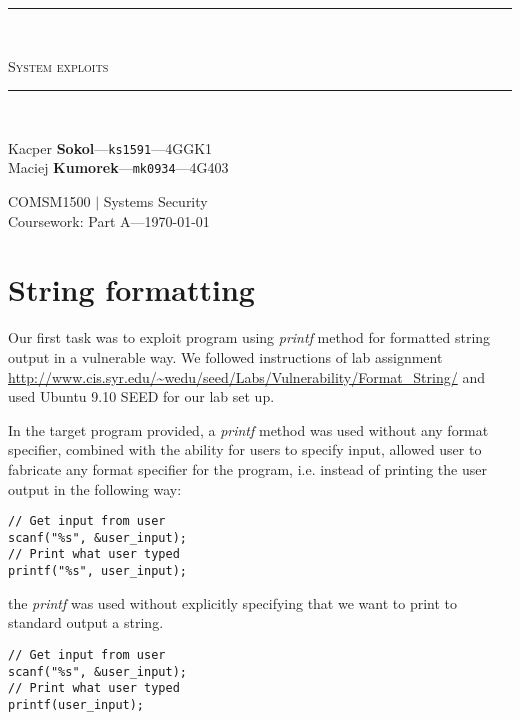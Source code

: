\documentclass[12pt, a4paper, pdflatex]{article}
\newcommand{\HRule}{\rule{\linewidth}{0.5mm}}
\begin{document}

\begin{center}
    \begin{large}
    {\HRule \\[0.2cm]}
    \textsc{System exploits}
    {\HRule \\[0.3cm]}
    \end{large}

    \begin{minipage}{ 0.49\textwidth }
        \begin{flushleft}
            Kacper \textbf{Sokol}---\texttt{ks1591}---4GGK1\\
            Maciej \textbf{Kumorek}---\texttt{mk0934}---4G403\\
        \end{flushleft}
    \end{minipage}
    \begin{minipage}{ 0.49\textwidth }
        \begin{flushright}
            {COMSM1500 $|$ Systems Security\\
            Coursework: Part A---\today\\[0.3cm]}
        \end{flushright}
    \end{minipage}
\end{center}


\section{String formatting}

Our first task was to exploit program using \emph{printf} method for formatted string output in a vulnerable way. We followed instructions of lab assignment  \url{http://www.cis.syr.edu/~wedu/seed/Labs/Vulnerability/Format_String/}
and used Ubuntu 9.10 SEED for our lab set up.

In the target program provided, a \emph{printf} method was used without any format specifier, combined with the ability for users to specify input, allowed user to fabricate any format specifier for the program, i.e. instead of printing the user output in the following way:
\vspace{1em}
\lstset{
	captionpos=b,
	frame=single,
	language=C,
	caption=Fragment of code that would not include the vulnerability,
	label=chroot:vul
}
\begin{lstlisting}
// Get input from user
scanf("%s", &user_input);
// Print what user typed
printf("%s", user_input);
\end{lstlisting}
the \emph{printf} was used without explicitly specifying that we want to print to standard output a string.
\vspace{1em}
\lstset{
	captionpos=b,
	frame=single,
	language=C,
	caption=Fragment of includes the vulnerability,
	label=chroot:vul2
}
\begin{lstlisting}
// Get input from user
scanf("%s", &user_input);
// Print what user typed
printf(user_input);
\end{lstlisting}
\end{document}
